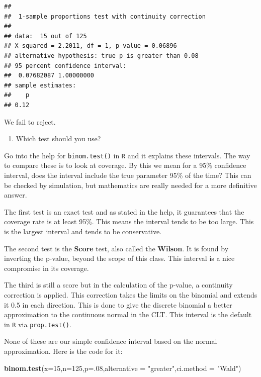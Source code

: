 \documentclass[
]{book}
\newenvironment{Shaded}{\begin{snugshade}}{\end{snugshade}}
\newcommand{\DataTypeTok}[1]{\textcolor[rgb]{0.13,0.29,0.53}{#1}}
\newcommand{\DecValTok}[1]{\textcolor[rgb]{0.00,0.00,0.81}{#1}}
\newcommand{\KeywordTok}[1]{\textcolor[rgb]{0.13,0.29,0.53}{\textbf{#1}}}
\newcommand{\NormalTok}[1]{#1}
\newcommand{\StringTok}[1]{\textcolor[rgb]{0.31,0.60,0.02}{#1}}
\providecommand{\tightlist}{%
  \setlength{\itemsep}{0pt}\setlength{\parskip}{0pt}}
\begin{document}
\begin{verbatim}
## 
##  1-sample proportions test with continuity correction
## 
## data:  15 out of 125
## X-squared = 2.2011, df = 1, p-value = 0.06896
## alternative hypothesis: true p is greater than 0.08
## 95 percent confidence interval:
##  0.07682087 1.00000000
## sample estimates:
##    p 
## 0.12
\end{verbatim}

We fail to reject.

\begin{enumerate}
\def\labelenumi{\alph{enumi}.}
\setcounter{enumi}{3}
\tightlist
\item
  Which test should you use?
\end{enumerate}

Go into the help for \texttt{binom.test()} in \texttt{R} and it explains these intervals. The way to compare these is to look at coverage. By this we mean for a 95\% confidence interval, does the interval include the true parameter 95\% of the time? This can be checked by simulation, but mathematics are really needed for a more definitive answer.

The first test is an exact test and as stated in the help, it guarantees that the coverage rate is at least 95\%. This means the interval tends to be too large. This is the largest interval and tends to be conservative.

The second test is the \textbf{Score} test, also called the \textbf{Wilson}. It is found by inverting the p-value, beyond the scope of this class. This interval is a nice compromise in its coverage.

The third is still a score but in the calculation of the p-value, a continuity correction is applied. This correction takes the limits on the binomial and extends it 0.5 in each direction. This is done to give the discrete binomial a better approximation to the continuous normal in the CLT. This interval is the default in \texttt{R} via \texttt{prop.test()}.

None of these are our simple confidence interval based on the normal approximation. Here is the code for it:

\begin{Shaded}
\begin{Highlighting}[]
\KeywordTok{binom.test}\NormalTok{(}\DataTypeTok{x=}\DecValTok{15}\NormalTok{,}\DataTypeTok{n=}\DecValTok{125}\NormalTok{,}\DataTypeTok{p=}\NormalTok{.}\DecValTok{08}\NormalTok{,}\DataTypeTok{alternative =} \StringTok{"greater"}\NormalTok{,}\DataTypeTok{ci.method =} \StringTok{"Wald"}\NormalTok{)}
\end{Highlighting}
\end{Shaded}
\end{document}
